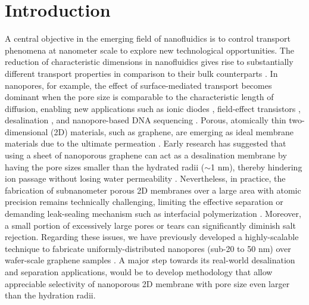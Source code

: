 \section{Introduction}
\label{sec:intro}
A central objective in the emerging field of nanofluidics is to
control transport phenomena at nanometer scale to explore new
technological opportunities. The reduction of characteristic
dimensions in nanofluidics gives rise to substantially different
transport properties in comparison to their bulk counterparts
\cite{Schoch_2008}. In nanopores, for example, the effect of
surface-mediated transport becomes dominant when the pore size is
comparable to the characteristic length of diffusion, enabling new
applications such as ionic diodes
\cite{Karnik_2007,siwy2002fabrication,vlassiouk2007nanofluidic},
field-effect transistors \cite{Nam_2009}, desalination
\cite{Heiranian_2015}, and nanopore-based DNA sequencing
\cite{Heerema_2016,Garaj_2013}. Porous, atomically thin
two-dimensional (2D) materials, such as graphene, are emerging as
ideal membrane materials due to the ultimate permeation
\cite{Suk_2010,Jiang_2009,Celebi_2014,Koenig_2012,Drahushuk_2012}. Early
research has suggested that using a sheet of nanoporous graphene can
act as a desalination membrane by having the pore sizes smaller than
the hydrated radii ($\sim$1 nm), thereby hindering ion passage without
losing water permeability
\cite{Cohen_Tanugi_2012,Suk_2014,Cohen_Tanugi_2014,Cohen_Tanugi_2015,O_Hern_2014,O_Hern_2015,Surwade_2015,Walker_2017,Ghosh_2018}.
Nevertheless, in practice, the fabrication of subnanometer porous 2D
membranes over a large area with atomic precision remains technically
challenging, limiting the effective separation or demanding
  leak-sealing mechanism such as interfacial polymerization
\cite{Suk_2014,Rollings_2016,O_Hern_2012,Wang_2017}. Moreover, a small
portion of excessively large pores or tears can significantly diminish
salt rejection. Regarding these issues, we have previously developed a
highly-scalable technique to fabricate uniformly-distributed nanopores
(sub-20 to 50 nm) over wafer-scale graphene samples
\cite{Choi_2018}. A major step towards its real-world desalination and
separation applications, would be to develop methodology that allow
appreciable selectivity of nanoporous 2D membrane with pore size even
larger than the hydration radii.
